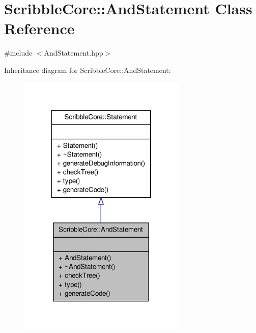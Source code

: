 \hypertarget{class_scribble_core_1_1_and_statement}{\section{Scribble\-Core\-:\-:And\-Statement Class Reference}
\label{class_scribble_core_1_1_and_statement}
}


{\ttfamily \#include $<$And\-Statement.\-hpp$>$}



Inheritance diagram for Scribble\-Core\-:\-:And\-Statement\-:
\nopagebreak
\begin{figure}[H]
\begin{center}
\leavevmode
\includegraphics[width=226pt]{class_scribble_core_1_1_and_statement__inherit__graph}
\end{center}
\end{figure}


